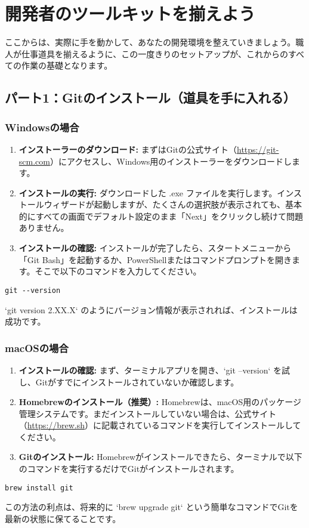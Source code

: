 \documentclass{ltjsarticle}
\begin{document}
\section{開発者のツールキットを揃えよう}
ここからは、実際に手を動かして、あなたの開発環境を整えていきましょう。職人が仕事道具を揃えるように、この一度きりのセットアップが、これからのすべての作業の基礎となります。

\subsection{パート1：Gitのインストール（道具を手に入れる）}
\subsubsection{Windowsの場合}
\begin{enumerate}
    \item \textbf{インストーラーのダウンロード:} まずはGitの公式サイト（\url{https://git-scm.com}）にアクセスし、Windows用のインストーラーをダウンロードします。
    \item \textbf{インストールの実行:} ダウンロードした .exe ファイルを実行します。インストールウィザードが起動しますが、たくさんの選択肢が表示されても、基本的にすべての画面でデフォルト設定のまま「Next」をクリックし続けて問題ありません。
    \item \textbf{インストールの確認:} インストールが完了したら、スタートメニューから「Git Bash」を起動するか、PowerShellまたはコマンドプロンプトを開きます。そこで以下のコマンドを入力してください。
\end{enumerate}
\begin{verbatim}
git --version
\end{verbatim}
`git version 2.XX.X` のようにバージョン情報が表示されれば、インストールは成功です。

\subsubsection{macOSの場合}
\begin{enumerate}
    \item \textbf{インストールの確認:} まず、ターミナルアプリを開き、`git --version` を試し、Gitがすでにインストールされていないか確認します。
    \item \textbf{Homebrewのインストール（推奨）:} Homebrewは、macOS用のパッケージ管理システムです。まだインストールしていない場合は、公式サイト（\url{https://brew.sh}）に記載されているコマンドを実行してインストールしてください。
    \item \textbf{Gitのインストール:} Homebrewがインストールできたら、ターミナルで以下のコマンドを実行するだけでGitがインストールされます。
\end{enumerate}
\begin{verbatim}
brew install git
\end{verbatim}
この方法の利点は、将来的に `brew upgrade git` という簡単なコマンドでGitを最新の状態に保てることです。
\end{document}
